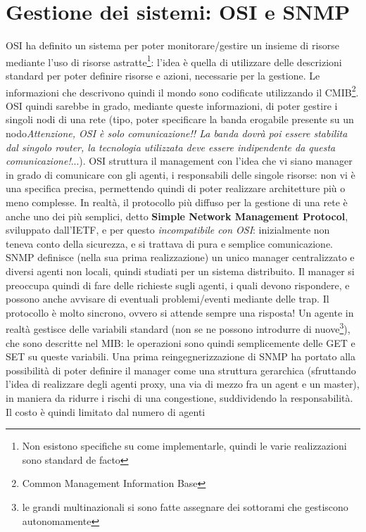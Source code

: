\section{Gestione dei sistemi: OSI e SNMP}
OSI ha definito un sistema per poter monitorare/gestire un insieme di risorse
mediante l'uso di risorse
astratte\footnote{Non esistono specifiche su come implementarle, quindi le varie
realizzazioni sono standard de facto}:
l'idea è quella di utilizzare delle descrizioni standard per poter definire
risorse e azioni, necessarie per la
gestione. Le informazioni che descrivono quindi il mondo sono codificate
utilizzando il CMIB\footnote{Common Management
Information Base}. OSI quindi sarebbe in grado, mediante queste informazioni, di
poter gestire i singoli nodi di una
rete (tipo, poter specificare la banda erogabile presente su un
nodo\textit{Attenzione, OSI è solo comunicazione!! La
banda dovrà poi essere stabilita dal singolo router, la tecnologia utilizzata
deve essere indipendente da questa
comunicazione!}...).
OSI struttura il management con l'idea che vi siano manager in grado di
comunicare con gli agenti, i responsabili
delle singole risorse: non vi è una specifica precisa, permettendo quindi di
poter realizzare architetture più o meno
complesse.
In realtà, il protocollo più diffuso per la gestione di una rete è anche uno dei
più semplici, detto \textbf{Simple
Network Management Protocol}, sviluppato dall'IETF, e per questo
\textit{incompatibile con OSI}: inizialmente non
teneva conto della sicurezza, e si trattava di pura e semplice comunicazione.
SNMP definisce (nella sua prima realizzazione) un unico manager centralizzato e
diversi agenti non locali, quindi
studiati per un sistema distribuito. Il manager si preoccupa quindi di fare
delle richieste sugli agenti, i quali
devono rispondere, e possono anche avvisare di eventuali problemi/eventi
mediante delle trap. Il protocollo è molto
sincrono, ovvero si attende sempre una risposta!
Un agente in realtà gestisce delle variabili standard (non se ne possono
introdurre di nuove\footnote{le grandi
multinazionali si sono fatte assegnare dei sottorami che gestiscono
autonomamente}), che sono descritte nel MIB: le
operazioni sono quindi semplicemente delle GET e SET su queste variabili.
Una prima reingegnerizzazione di SNMP ha portato alla possibilità di poter
definire il manager come una struttura
gerarchica (sfruttando l'idea di realizzare degli agenti proxy, una via di mezzo
fra un agent e un master), in maniera
da ridurre i rischi di una congestione, suddividendo la responsabilità. Il costo
è quindi limitato dal numero di agenti

